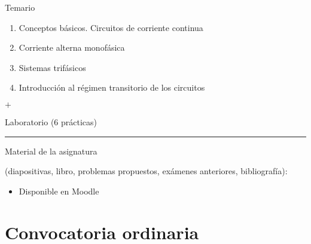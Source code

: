 \documentclass[aspectratio=169, usenames,svgnames,dvipsnames]{beamer}
\begin{document}
\begin{frame}{Temario}
    \begin{enumerate}
        \item Conceptos básicos. Circuitos de corriente continua
        \vspace{1mm}
        \item Corriente alterna monofásica
        \vspace{1mm}
        \item Sistemas trifásicos
        \vspace{1mm}
        \item Introducción al régimen transitorio de los circuitos
    \end{enumerate}
    \hspace{7mm} $+$
    
    \hspace{7mm} Laboratorio (6 prácticas)

    \vspace{1mm}

    \noindent\rule{\textwidth}{0.5pt}
    
    \vspace{3mm}
    
    \alert{Material de la asignatura}
    
    (diapositivas, libro, problemas propuestos, exámenes anteriores, bibliografía): 
    
    \begin{itemize}
        \addtolength{\itemsep}{10mm}
        \item Disponible en Moodle
    \end{itemize}

\end{frame}


\section*{Convocatoria ordinaria}
\end{document}
